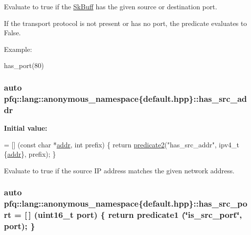 Evaluate to {\ttfamily true} if the \hyperlink{structpfq_1_1lang_1_1SkBuff}{Sk\+Buff} has the given source or destination port. 

If the transport protocol is not present or has no port, the predicate evaluates to False.

Example\+:

has\+\_\+port(80) \hypertarget{namespacepfq_1_1lang_1_1anonymous__namespace_02default_8hpp_03_acb03dd3e34d6dd7e83d621fa9077194c}{
\subsubsection[{has\+\_\+src\+\_\+addr}]{\setlength{\rightskip}{0pt plus 5cm}auto pfq\+::lang\+::anonymous\+\_\+namespace\{default.\+hpp\}\+::has\+\_\+src\+\_\+addr}}\label{namespacepfq_1_1lang_1_1anonymous__namespace_02default_8hpp_03_acb03dd3e34d6dd7e83d621fa9077194c}
{\bfseries Initial value\+:}
\begin{DoxyCode}
= [] (\textcolor{keyword}{const} \textcolor{keywordtype}{char} *\hyperlink{namespacepfq_1_1lang_1_1anonymous__namespace_02default_8hpp_03_a13cabe468839119d8d68540e3c60718b}{addr}, \textcolor{keywordtype}{int} prefix)
        \{
            \textcolor{keywordflow}{return} \hyperlink{namespacepfq_1_1lang_a7282b9a2e51359b8db0dcdb9fadf2fd1}{predicate2}(\textcolor{stringliteral}{"has\_src\_addr"}, ipv4\_t \{\hyperlink{namespacepfq_1_1lang_1_1anonymous__namespace_02default_8hpp_03_a13cabe468839119d8d68540e3c60718b}{addr}\}, prefix);
        \}
\end{DoxyCode}


Evaluate to {\ttfamily true} if the source I\+P address matches the given network address. 

\hypertarget{namespacepfq_1_1lang_1_1anonymous__namespace_02default_8hpp_03_a964d5ed41f50a1f3a04176f8e54d7a5a}{
\subsubsection[{has\+\_\+src\+\_\+port}]{\setlength{\rightskip}{0pt plus 5cm}auto pfq\+::lang\+::anonymous\+\_\+namespace\{default.\+hpp\}\+::has\+\_\+src\+\_\+port = \mbox{[}$\,$\mbox{]} (uint16\+\_\+t {\bf port}) \{ return {\bf predicate1} (\char`\"{}is\+\_\+src\+\_\+port\char`\"{}, port); \}}}\label{namespacepfq_1_1lang_1_1anonymous__namespace_02default_8hpp_03_a964d5ed41f50a1f3a04176f8e54d7a5a}


